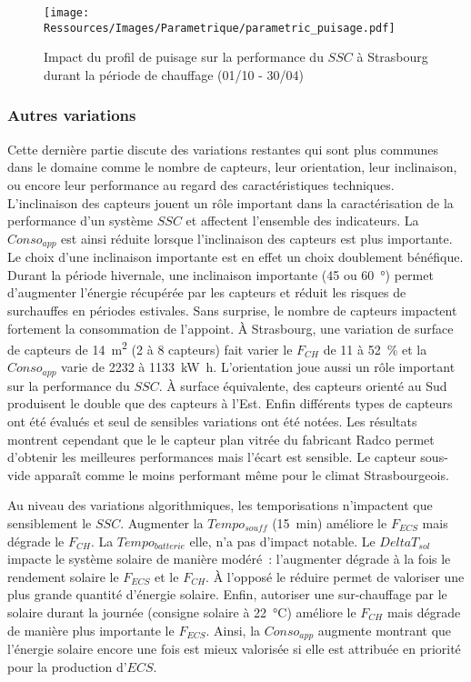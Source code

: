 \begin{figure}
    \begin{center}
        \texttt{[image: Ressources/Images/Parametrique/parametric\_puisage.pdf]}
    \end{center}
    \caption{Impact du profil de puisage sur la performance
             du $SSC$ à Strasbourg durant la période de chauffage (01/10 - 30/04)
             \label{fig:impact_profil_puisage}}
\end{figure}


\subsubsection{Autres variations} %
\label{ssub:autres_variations}
Cette dernière partie discute des variations restantes qui sont plus communes dans
le domaine comme le nombre de capteurs, leur orientation, leur inclinaison, ou encore
leur performance au regard des caractéristiques techniques.
L’inclinaison des capteurs jouent un rôle important
dans la caractérisation de la performance d’un système $SSC$ et affectent l’ensemble
des indicateurs. La $Conso_{app}$ est ainsi réduite lorsque l’inclinaison
des capteurs est plus importante. Le choix d’une inclinaison importante est en effet
un choix doublement bénéfique. Durant la période hivernale, une inclinaison importante
(\num{45} ou \SI{60}{\degree}) permet d’augmenter l’énergie récupérée par les capteurs
et réduit les risques de surchauffes en périodes estivales.
Sans surprise, le nombre de capteurs impactent fortement la consommation
de l’appoint. À Strasbourg, une variation de surface de capteurs de \SI{14}{\meter\squared} (\num{2} à \num{8} capteurs)
fait varier le $F_{CH}$ de \num{11} à \SI{52}{\percent} et la $Conso_{app}$
varie de \num{2232} à \SI{1133}{\kilo\watt\hour}.
L’orientation joue aussi un rôle important sur la performance du $SSC$. À surface équivalente,
des capteurs orienté au Sud produisent le double que des capteurs à l’Est.
Enfin différents types de capteurs ont été évalués et seul de sensibles variations
ont été notées. Les résultats montrent cependant
que le le capteur plan vitrée du fabricant Radco permet d’obtenir les meilleures
performances mais l’écart est sensible. Le capteur sous-vide apparaît comme le moins
performant même pour le climat Strasbourgeois.

Au niveau des variations algorithmiques, les temporisations n’impactent que sensiblement
le $SSC$. Augmenter la $Tempo_{souff}$ (\SI{15}{min}) améliore le $F_{ECS}$ mais dégrade le $F_{CH}$.
La $Tempo_{batterie}$ elle, n’a pas d’impact notable.
Le $DeltaT_{sol}$ impacte le système solaire de manière modéré~: l’augmenter dégrade
à la fois le rendement solaire le $F_{ECS}$ et le $F_{CH}$. À l’opposé le réduire
permet de valoriser une plus grande quantité d’énergie solaire. Enfin, autoriser une
sur-chauffage par le solaire durant la journée (consigne solaire à \SI{22}{\celsius})
améliore le $F_{CH}$ mais dégrade de manière plus importante le $F_{ECS}$. Ainsi,
la $Conso_{app}$ augmente montrant que l’énergie solaire encore une
fois est mieux valorisée si elle est attribuée en priorité pour la production d’$ECS$.

